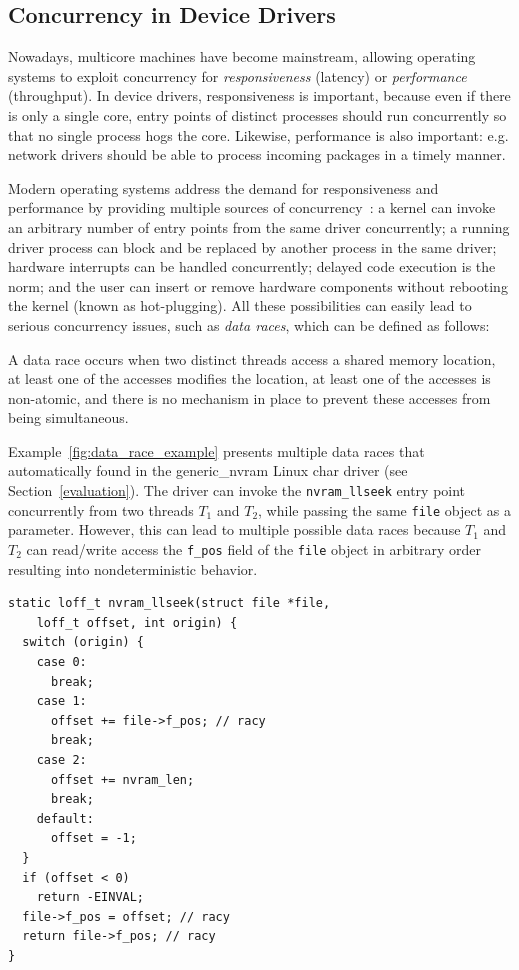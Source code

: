 \subsection{Concurrency in Device Drivers}
\label{bg:concurrency}

Nowadays, multicore machines have become mainstream, allowing operating systems to exploit concurrency for \emph{responsiveness} (latency) or \emph{performance} (throughput). In device drivers, responsiveness is important, because even if there is only a single core, entry points of distinct processes should run concurrently so that no single process hogs the core. Likewise, performance is also important: e.g. network drivers should be able to process incoming packages in a timely manner.

Modern operating systems address the demand for responsiveness and performance by providing multiple sources of concurrency~\cite{corbet2005linux}: a kernel can invoke an arbitrary number of entry points from the same driver concurrently; a running driver process can block and be replaced by another process in the same driver; hardware interrupts can be handled concurrently; delayed code execution is the norm; and the user can insert or remove hardware components without rebooting the kernel (known as hot-plugging). All these possibilities can easily lead to serious concurrency issues, such as \emph{data races}, which can be defined as follows:

\begin{definition}
\label{definition:datarace}
A data race occurs when two distinct threads access a shared memory location, at least one of the accesses modifies the location, at least one of the accesses is non-atomic, and there is no mechanism in place to prevent these accesses from being simultaneous.
\end{definition}

Example~\ref{fig:data_race_example} presents multiple data races that \whoop automatically found in the generic\_nvram Linux char driver (see Section~\ref{evaluation}). The driver can invoke the \texttt{nvram\_llseek} entry point concurrently from two threads $T_1$ and $T_2$, while passing the same \texttt{file} object as a parameter. However, this can lead to multiple possible data races because $T_1$ and $T_2$ can read/write access the \texttt{f\_pos} field of the \texttt{file} object in arbitrary order resulting into nondeterministic behavior.

\begin{lstlisting}[caption = Data races in the generic\_nvram char driver that \whoop found., label = fig:data_race_example]
static loff_t nvram_llseek(struct file *file,
    loff_t offset, int origin) {
  switch (origin) {
    case 0:
      break;
    case 1:
      offset += file->f_pos; // racy
      break;
    case 2:
      offset += nvram_len;
      break;
    default:
      offset = -1;
  }
  if (offset < 0)
    return -EINVAL;
  file->f_pos = offset; // racy
  return file->f_pos; // racy
}
\end{lstlisting}

